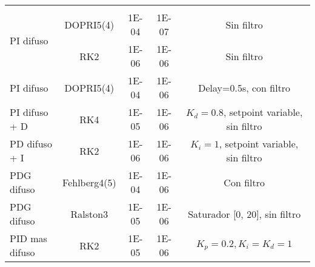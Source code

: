 {\begin{longtable}{l @{\extracolsep{\fill}} cccc}
                                     &              &             &             &                                           \\[-3pt]  
         \multirow{2}{*}{PI difuso}  & DOPRI5(4)    & \num{1E-04} & \num{1E-07} & Sin filtro                                \\
                                     & RK2          & \num{1E-06} & \num{1E-06} & Sin filtro                                \\
         PI difuso                   & DOPRI5(4)    & \num{1E-04} & \num{1E-06} & Delay=0.5s, con filtro                    \\
         PI difuso + D               & RK4          & \num{1E-05} & \num{1E-06} & $K_d=0.8$, setpoint variable, sin filtro  \\
         PD difuso + I               & RK2          & \num{1E-06} & \num{1E-06} & $K_i=1$, setpoint variable, sin filtro    \\
         PDG difuso                  & Fehlberg4(5) & \num{1E-04} & \num{1E-06} & Con filtro                                \\
         PDG difuso                  & Ralston3     & \num{1E-05} & \num{1E-06} & Saturador [0, 20], sin filtro             \\
         PID mas difuso              & RK2          & \num{1E-05} & \num{1E-06} & $K_p=0.2, K_i=K_d=1$                      \\
        \end{longtable}}

